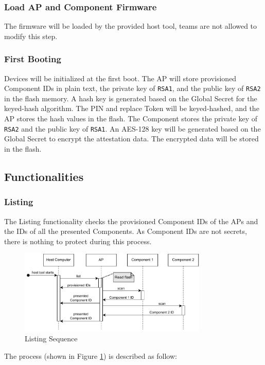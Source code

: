 \documentclass[11pt,oneside,onecolumn,letterpaper]{article}
\newcounter{alg}
\begin{document}
\subsubsection{Load AP and Component Firmware}
The firmware will be loaded by the provided host tool,
teams are not allowed to modify this step.

\subsubsection{First Booting}
Devices will be initialized at the first boot.
The AP will store provisioned Component IDs in plain text,
the private key of \texttt{RSA1},
and the public key of \texttt{RSA2} in the flash memory.
A hash key is generated based on the Global Secret for the keyed-hash algorithm.
The PIN and replace Token will be keyed-hashed,
and the AP stores the hash values in the flash.
The Component stores the private key of \texttt{RSA2} and the public key of \texttt{RSA1}.
An AES-128 key will be generated based on the Global Secret to encrypt the attestation data.
The encrypted data will be stored in the flash.

\subsection{Functionalities}
\subsubsection{Listing}
The Listing functionality checks the provisioned Component IDs of the APs and the IDs of all the presented Components.
As Component IDs are not secrets,
there is nothing to protect during this process.

\begin{figure}[h]
	\centering
	\includegraphics[width=0.8\textwidth]{pics/list.pdf}
	\caption{Listing Sequence}
	\label{fig:functionality_list}
\end{figure}

The process (shown in Figure \ref{fig:functionality_list}) is described as follow:
\end{document}
